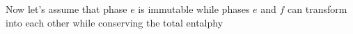 Now let's assume that phase \(e\) is immutable while phases \(e\) and \(f\) can transform into each other while conserving the total entalphy